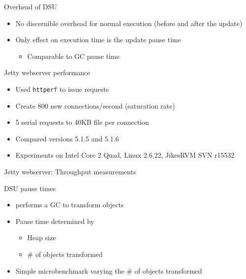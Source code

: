 \begin{frame}{Overhead of DSU}%
\begin{itemize}
\item No discernible overhead for normal execution (before and after the
update)
\item Only effect on execution time is the update pause time
  \begin{itemize}
  \item Comparable to GC pause time
  \end{itemize}
\end{itemize}
\end{frame}

\begin{frame}{Jetty webserver performance}%
\begin{itemize}
\item Used \texttt{httperf} to issue requests
\item Create 800 new connections/second (saturation rate)
\item 5 serial requests to 40KB file per connection
\item Compared versions 5.1.5 and 5.1.6
\item Experiments on Intel Core 2 Quad, Linux 2.6.22, JikesRVM SVN r15532
\end{itemize}
\end{frame}

\begin{frame}{Jetty webserver: Throughput measurements}%
\begin{center}
\centering{}
\end{center}
\end{frame}

\begin{frame}{DSU pause times}%
\begin{itemize}
\item \DSU{} performs a GC to transform objects
\item Pause time determined by
  \begin{itemize}
  \item Heap size
  \item \# of objects transformed
  \end{itemize}
\item Simple microbenchmark varying the \# of objects transformed
\end{itemize}
\end{frame}

